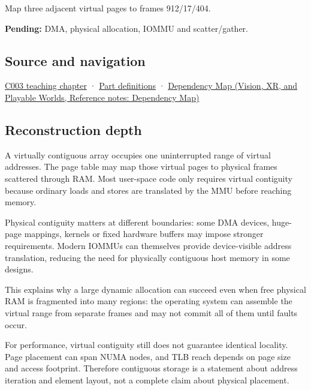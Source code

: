 Map three adjacent virtual pages to frames 912/17/404.

\textbf{Pending:} DMA, physical allocation, IOMMU and scatter/gather.

\subsection{Source and navigation}\label{appendix-f897c1ddac8f-source-and-navigation}

\hyperref[01-foundations-i-ch002-where-the-bytes-live]{C003 teaching chapter} · \hyperref[appendix-fd090d982a15-m003---parts-41-60]{Part definitions} · \href{../07-Vision-XR-and-Playable-Worlds/main.pdf\#nameddest=appendix-4ad47bdd269a}{Dependency Map (Vision, XR, and Playable Worlds, Reference notes: Dependency Map)}

\subsection{Reconstruction depth}\label{appendix-f897c1ddac8f-reconstruction-depth}

A virtually contiguous array occupies one uninterrupted range of virtual addresses. The page table may map those virtual pages to physical frames scattered through RAM. Most user-space code only requires virtual contiguity because ordinary loads and stores are translated by the MMU before reaching memory.

Physical contiguity matters at different boundaries: some DMA devices, huge-page mappings, kernels or fixed hardware buffers may impose stronger requirements. Modern IOMMUs can themselves provide device-visible address translation, reducing the need for physically contiguous host memory in some designs.

This explains why a large dynamic allocation can succeed even when free physical RAM is fragmented into many regions: the operating system can assemble the virtual range from separate frames and may not commit all of them until faults occur.

For performance, virtual contiguity still does not guarantee identical locality. Page placement can span NUMA nodes, and TLB reach depends on page size and access footprint. Therefore contiguous storage is a statement about address iteration and element layout, not a complete claim about physical placement.
